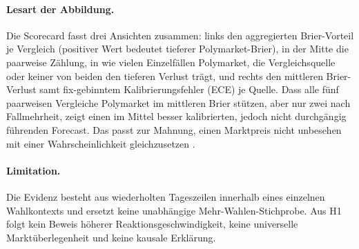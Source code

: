 \paragraph{Lesart der Abbildung.}
Die Scorecard fasst drei Ansichten zusammen: links den aggregierten Brier-Vorteil je Vergleich (positiver Wert bedeutet tieferer Polymarket-Brier), in der Mitte die paarweise Zählung, in wie vielen Einzelfällen Polymarket, die Vergleichsquelle oder keiner von beiden den tieferen Verlust trägt, und rechts den mittleren Brier-Verlust samt fix-gebinntem Kalibrierungsfehler (ECE) je Quelle. Dass alle fünf paarweisen Vergleiche Polymarket im
mittleren Brier stützen, aber nur zwei nach Fallmehrheit, zeigt einen im Mittel
besser kalibrierten, jedoch nicht durchgängig führenden Forecast. Das passt zur
Mahnung, einen Marktpreis nicht unbesehen mit einer Wahrscheinlichkeit
gleichzusetzen \citep{lit_manski_2006}.

\paragraph{Limitation.}
Die Evidenz besteht aus wiederholten Tageszeilen innerhalb eines einzelnen
Wahlkontexts und ersetzt keine unabhängige Mehr-Wahlen-Stichprobe. Aus H1
folgt kein Beweis höherer Reaktionsgeschwindigkeit, keine universelle
Marktüberlegenheit und keine kausale Erklärung.
